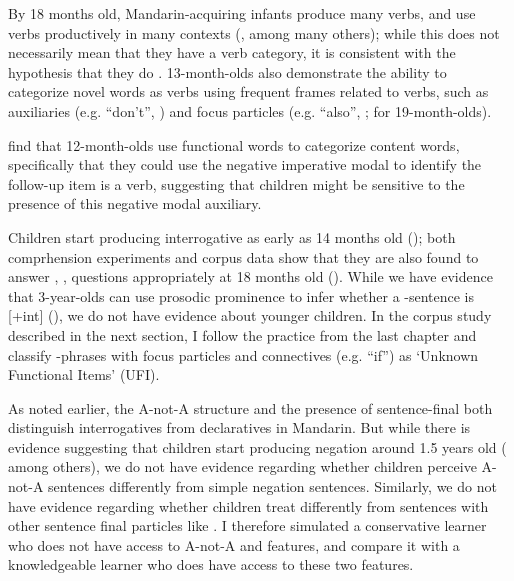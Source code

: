  By 18 months old, Mandarin-acquiring infants produce many verbs, and use verbs productively in many contexts (\cite{tardif1993verb,tardif1996verb, xiaolee2006,zhangshili2015infant}, among many others); while this does not necessarily mean that they have a verb category, it is consistent with the hypothesis that they do . 13-month-olds also demonstrate the ability to categorize novel words as verbs using frequent frames related to verbs, such as auxiliaries (e.g.  ``don't'', \cite{zhang2015bie}) and focus particles (e.g.  ``also'', \cite{zhangshili2015infant}; \cite{ying2021func} for 19-month-olds).

  \cite{zhang2015bie} find that 12-month-olds use functional words to categorize content words, specifically that they could use the negative imperative modal  to identify the follow-up item is a verb, suggesting that children might be sensitive to the presence of this negative modal auxiliary.  %


 Children start producing interrogative \twh{} as early as 14 months old (\cite{lee1989acq, fan2012, linjing2014}); both comprhension experiments and corpus data show that they are also found to answer , ,  questions appropriately at 18 months old (\citealt{fan2012,moradlou2020}). While we have evidence that 3-year-olds can use prosodic prominence to infer whether a \twh-sentence is [+int] (\cite{WHanything}), we do not have evidence about younger children. In the corpus study described in the next section, I follow the practice from the last chapter and classify \twh-phrases with focus particles and connectives (e.g.  ``if'') as `Unknown Functional Items' (UFI).

 As noted earlier, the A-not-A structure and the presence of sentence-final  both distinguish interrogatives from declaratives in Mandarin. But while there is evidence suggesting that children start producing negation around 1.5 years old (\cite{lee1982neg,fan2007,li2019neg, huang2022manchild} among others), we do not have evidence regarding whether children perceive A-not-A sentences differently from simple negation sentences. Similarly, we do not have evidence regarding whether children treat  differently from sentences with other sentence final particles like . I therefore simulated a conservative learner who does not have access to A-not-A and  features, and compare it with a knowledgeable learner who does have access to these two features. 





